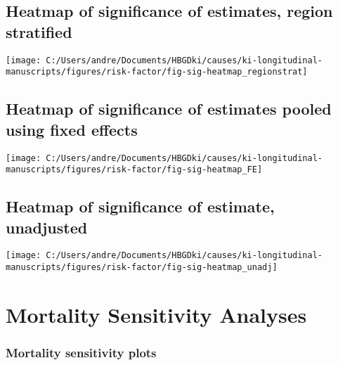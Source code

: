 \documentclass[9pt,]{book}
\begin{document}
\section{Heatmap of significance of estimates, region
stratified}\label{heatmap-of-significance-of-estimates-region-stratified}

\texttt{[image: C:/Users/andre/Documents/HBGDki/causes/ki-longitudinal-manuscripts/figures/risk-factor/fig-sig-heatmap\_regionstrat]}

\section{Heatmap of significance of estimates pooled using fixed
effects}\label{heatmap-of-significance-of-estimates-pooled-using-fixed-effects}

\texttt{[image: C:/Users/andre/Documents/HBGDki/causes/ki-longitudinal-manuscripts/figures/risk-factor/fig-sig-heatmap\_FE]}

\section{Heatmap of significance of estimate,
unadjusted}\label{heatmap-of-significance-of-estimate-unadjusted}

\texttt{[image: C:/Users/andre/Documents/HBGDki/causes/ki-longitudinal-manuscripts/figures/risk-factor/fig-sig-heatmap\_unadj]}

\chapter{Mortality Sensitivity Analyses}\label{mortality}

\raggedright

\subsection{Mortality sensitivity
plots}\label{mortality-sensitivity-plots}
\end{document}
